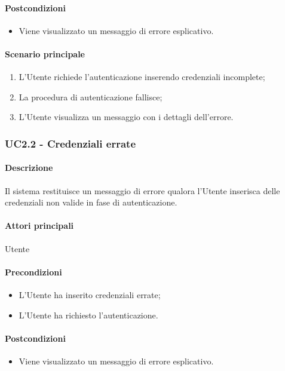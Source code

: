 \paragraph*{Postcondizioni}
\begin{itemize}
  \item Viene visualizzato un messaggio di errore esplicativo.
\end{itemize}

\paragraph*{Scenario principale}
\begin{enumerate}
  \item L'Utente richiede l'autenticazione inserendo credenziali incomplete;
  \item La procedura di autenticazione fallisce;
  \item L'Utente visualizza un messaggio con i dettagli dell'errore.
\end{enumerate}


\subsubsection{UC2.2 - Credenziali errate}\label{UC2point2}
\paragraph*{Descrizione}
Il sistema restituisce un messaggio di errore qualora l'Utente inserisca delle credenziali non valide in fase di autenticazione.

\paragraph*{Attori principali}
Utente

\paragraph*{Precondizioni}
\begin{itemize}
  \item L'Utente ha inserito credenziali errate;
  \item L'Utente ha richiesto l'autenticazione. 
\end{itemize}

\paragraph*{Postcondizioni}
\begin{itemize}
  \item Viene visualizzato un messaggio di errore esplicativo.
\end{itemize}

